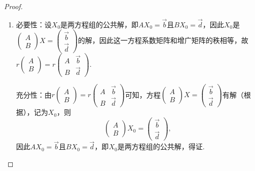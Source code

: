 \begin{proof}
    \begin{enumerate}
        \item 必要性：设$X_0$是两方程组的公共解，即$AX_0=\vec{b}$且$BX_0=\vec{d}$，因此$X_0$是$\begin{pmatrix}
                      A \\ B
                  \end{pmatrix}X=\begin{pmatrix}
                      \vec{b} \\ \vec{d}
                  \end{pmatrix}$的解，因此这一方程系数矩阵和增广矩阵的秩相等，故$r\begin{pmatrix}
                      A \\ B
                  \end{pmatrix}=r\begin{pmatrix}
                      A & \vec{b} \\ B & \vec{d}
                  \end{pmatrix}$.

              充分性：由$r\begin{pmatrix}
                      A \\ B
                  \end{pmatrix}=r\begin{pmatrix}
                      A & \vec{b} \\ B & \vec{d}
                  \end{pmatrix}$可知，方程$\begin{pmatrix}
                      A \\ B
                  \end{pmatrix}X=\begin{pmatrix}
                      \vec{b} \\ \vec{d}
                  \end{pmatrix}$有解（根据），记为$X_0$，则
              \[\begin{pmatrix}
                      A \\ B
                  \end{pmatrix}X_0=\begin{pmatrix}
                      \vec{b} \\ \vec{d}
                  \end{pmatrix},\]
              因此$AX_0=\vec{b}$且$BX_0=\vec{d}$，即$X_0$是两方程组的公共解，得证.


\end{enumerate}
\end{proof}

